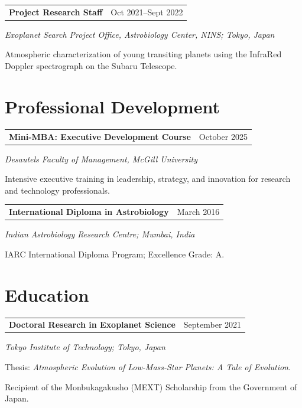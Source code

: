 \documentclass[10pt,a4paper]{article}
\makeatletter
\newcommand{\grantheading}[2]{%
\begin{tabularx}{\textwidth}{
    @{}
    >{\raggedright\arraybackslash}X
    >{\raggedleft\arraybackslash}p{4.5cm}
    @{}
}
\textbf{#1} & #2
\end{tabularx}
}
\makeatother
\begin{document}


\grantheading
{Project Research Staff}
{Oct 2021--Sept 2022}
\emph{Exoplanet Search Project Office, Astrobiology Center,
NINS; Tokyo, Japan}

{\color{entrylight}
\vspace{-1.0mm}Atmospheric characterization of young transiting planets using the
InfraRed Doppler spectrograph on the Subaru Telescope.
\par}



\section{Professional Development}

\grantheading
{Mini-MBA: Executive Development Course}
{October 2025}
\emph{Desautels Faculty of Management, McGill University}

{\color{entrylight}
\vspace{-1.0mm}Intensive executive training in leadership, strategy, and innovation
for research and technology professionals.
\par}



\grantheading
{International Diploma in Astrobiology}
{March 2016}
\emph{Indian Astrobiology Research Centre; Mumbai, India}

{\color{entrylight}
\vspace{-1.0mm}IARC International Diploma Program; Excellence Grade: A.
\par}



\section{Education}

\grantheading
{Doctoral Research in Exoplanet Science}
{September 2021}
\emph{Tokyo Institute of Technology; Tokyo, Japan}

{\color{entrylight}
\vspace{-1.0mm}Thesis: \emph{Atmospheric Evolution of Low-Mass-Star Planets:
A Tale of Evolution}.

\vspace{-1.0mm}Recipient of the Monbukagakusho (MEXT) Scholarship from the
Government of Japan.
\par}
\end{document}
